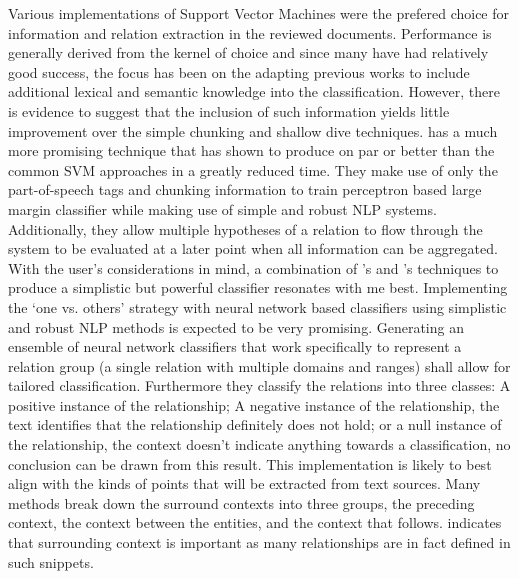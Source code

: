 \documentclass[12pt]{article} %
\begin{document}
Various implementations of Support Vector Machines were the prefered choice for information and relation extraction in the reviewed documents.\cite{snowball}\cite{nonlocalExtraction}\cite{espressoExtraction}\cite{learningExtraction}\cite{exploringVarious} Performance is generally derived from the kernel of choice and since many have had relatively good success, the focus has been on the adapting previous works to include additional lexical and semantic knowledge into the classification\cite{exploringVarious}. However, there is evidence to suggest that the inclusion of such information yields little improvement over the simple chunking and shallow dive techniques\cite{exploringVarious}. \cite{robustPerceptron} has a much more promising technique that has shown to produce on par or better than the common SVM approaches in a greatly reduced time. They make use of only the part-of-speech tags and chunking information to train perceptron based large margin classifier while making use of simple and robust NLP systems. Additionally, they allow multiple hypotheses of a relation to flow through the system to be evaluated at a later point when all information can be aggregated. With the user’s considerations in mind, a combination of \cite{robustPerceptron}’s and \cite{exploringVarious}’s techniques to produce a simplistic but powerful classifier resonates with me best. Implementing the ‘one vs. others’ strategy with neural network based classifiers using simplistic and robust NLP methods is expected to be very promising.\cite{selfsupervisedExtraction} Generating an ensemble of neural network classifiers that work specifically to represent a relation group (a single relation with multiple domains and ranges) shall allow for tailored classification. Furthermore they classify the relations into three classes: A positive instance of the relationship; A negative instance of the relationship, the text identifies that the relationship definitely does not hold; or a null instance of the relationship, the context doesn’t indicate anything towards a classification, no conclusion can be drawn from this result. This implementation is likely to best align with the kinds of points that will be extracted from text sources. Many methods break down the surround contexts into three groups, the preceding context, the context between the entities, and the context that follows. \cite{treeKernel} indicates that surrounding context is important as many relationships are in fact defined in such snippets.\\
\end{document}
